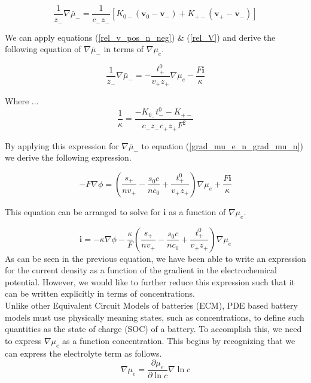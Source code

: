 \documentclass[lettersize,journal]{IEEEtran}
\begin{document}
\begin{equation}
\frac{1}{z_{-}} \nabla \bar{\mu}_{-} =\frac{1}{c_{-} z_{-}}\left[K_{0-}\left(\mathbf{v}_{0}-\mathbf{v}_{-}\right)+K_{+-}\left(\mathbf{v}_{+}-\mathbf{v}_{-}\right)\right]
\end{equation}

\noindent We can apply equations (\ref{rel_v_pos_n_neg}) \& (\ref{rel_V}) and derive the following equation of $\nabla \bar{\mu}_{-}$ in terms of $\nabla \mu_e$.

\begin{equation}
\frac{1}{z_{-}} \nabla \bar{\mu}_{-} =-\frac{t_{+}^{0}}{v_{+} z_{+}} \nabla \mu_{e}-\frac{F \mathbf{i}}{\kappa}
\end{equation}


\noindent Where ...
\begin{equation}
\frac{1}{\kappa}=\frac{-K_{0_{-}} t_{-}^{0}-K_{+-}}{c_{-} z_{-} c_{+} z_{+} F^{2}}
\end{equation}

\noindent By applying this expression for $\nabla \bar{\mu}_{-}$ to equation (\ref{grad_mu_e_n_grad_mu_n}) we derive the following expression.


\begin{equation}
-F \nabla \phi =\left(\frac{s_{+}}{n v_{+}}-\frac{s_{0} c}{n c_{0}}+\frac{t_{+}^{0}}{v_{+} z_{+}}\right) \nabla \mu_{e}+\frac{F \mathbf{i}}{\kappa}
\end{equation}

\noindent This equation can be arranged to solve for $\mathbf{i}$ as a function of $\nabla \mu_e$.


\begin{equation}\label{current_density_mu_e}
  \mathbf{i} =-\kappa \nabla \phi-\frac{\kappa}{F}\left(\frac{s_{+}}{n v_{+}}-\frac{s_{0} c}{n c_{0}}+\frac{t_{+}^{0}}{v_{+} z_{+}}\right) \nabla \mu_{e}
\end{equation}
\noindent As can be seen in the previous equation, we have been able to write an expression for the current density as a function of the gradient in the electrochemical potential. However, we would like to further reduce this expression such that it can be written explicitly in terms of concentrations. \\

Unlike other Equivalent Circuit Models of batteries (ECM), PDE based battery models must use physically meaning states, such as concentrations, to define such quantities as the state of charge (SOC) of a battery. To accomplish this, we need to express $\nabla \mu_e$ as a function concentration. This begins by recognizing that we can express the electrolyte term as follows.
\begin{equation}
\nabla \mu_{e}=\frac{\partial \mu_{e}}{\partial \ln c} \nabla \ln c
\end{equation}
\end{document}
